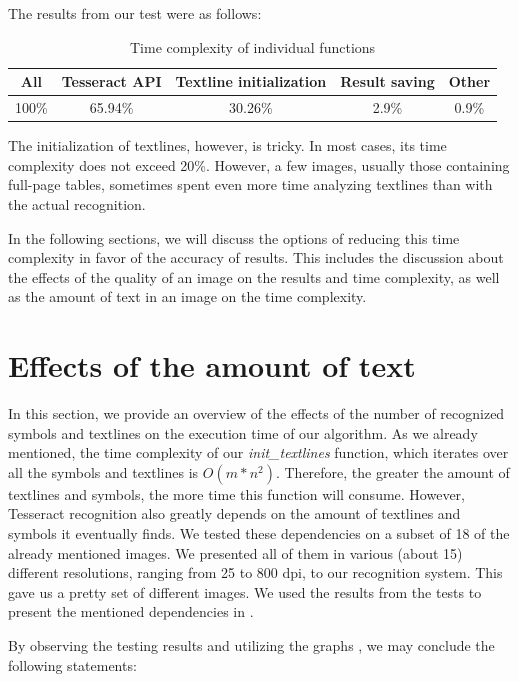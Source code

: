 The results from our test were as follows:

\begin{table}[H]
\centering
\begin{tabular}{ccccc}
\toprule
\textbf{All} & \textbf{Tesseract API} & \textbf{Textline initialization} & \textbf{Result saving} & \textbf{Other}\\
\midrule
100\% & 65.94\% & 30.26\% & 2.9\% & 0.9\% \\
\bottomrule
\end{tabular}
\caption{Time complexity of individual functions} 
\label{table:forward-inverted}
\end{table}

The initialization of textlines, however, is tricky. In most cases, its time complexity does not exceed 20\%. However, a few images, usually those containing full-page tables, sometimes spent even more time analyzing textlines than with the actual recognition.

In the following sections, we will discuss the options of reducing this time complexity in favor of the accuracy of results. This includes the discussion about the effects of the quality of an image on the results and time complexity, as well as the amount of text in an image on the time complexity.

\section{Effects of the amount of text}

In this section, we provide an overview of the effects of the number of recognized symbols and textlines on the execution time of our algorithm. As we already mentioned, the time complexity of our \emph{init\_textlines} function, which iterates over all the symbols and textlines is $O(m*n^2)$. Therefore, the greater the amount of textlines and symbols, the more time this function will consume. However, Tesseract recognition also greatly depends on the amount of textlines and symbols it eventually finds. We tested these dependencies on a subset of 18 of the already mentioned images. We presented all of them in various (about 15) different resolutions, ranging from 25 to 800 dpi, to our recognition system. 
This gave us a pretty  set of different images. We used the results from the tests to present the mentioned dependencies in .

By observing the testing results and utilizing the graphs , we may conclude the following statements:


